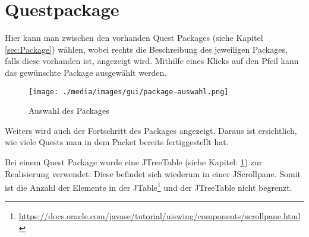 \section{Questpackage}
Hier kann man zwischen den vorhanden Quest Packages (siehe Kapitel \ref{sec:Package}) wählen, wobei rechts die Beschreibung des jeweiligen Packages, falls diese vorhanden ist, angezeigt wird. Mithilfe eines Klicks auf den Pfeil kann das gewünschte Package ausgewählt werden.

\begin{figure}[h] 
  \centering
     \texttt{[image: ./media/images/gui/package-auswahl.png]}
  \caption{Auswahl des Packages}
  \label{fig:Package_Auswahl}
\end{figure}

Weiters wird auch der Fortschritt des Packages angezeigt. Daraus ist ersichtlich, wie viele Quests man in dem Packet bereits fertiggestellt hat.

Bei einem Quest Package wurde eine JTreeTable (siehe Kapitel: \ref{}) zur Realisierung verwendet. Diese befindet sich wiederum in einer JScrollpane. Somit ist die Anzahl der Elemente in der JTable\footnote{\url{https://docs.oracle.com/javase/tutorial/uiswing/components/scrollpane.html}}  und der JTreeTable nicht begrenzt.
